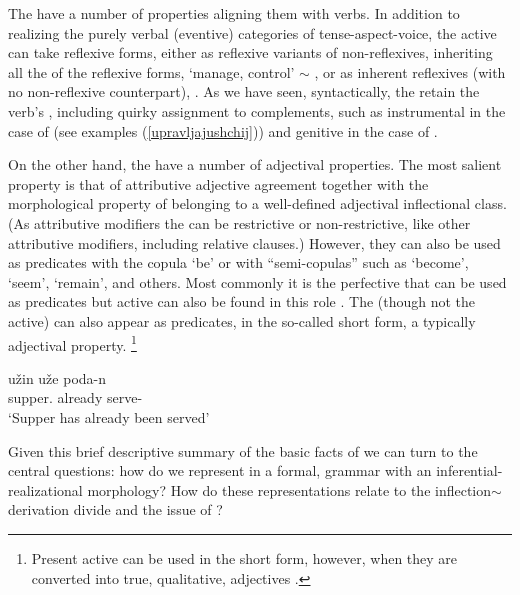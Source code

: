 \documentclass[output=paper,
modfonts
]{LSP/langsci}
\begin{document}
%
The  have a number of properties aligning them with verbs. In addition to  realizing the purely verbal (eventive) categories of tense-aspect-voice, the active  can take reflexive forms, either as reflexive variants of non-reflexives, inheriting all the  of the reflexive forms,  ‘manage, control’ $\sim$ , or as inherent reflexives (with no non-reflexive counterpart), . As we have seen, syntactically, the  retain the verb’s , including quirky  assignment to complements, such as instrumental in the case of 
 (see examples (\ref{upravljajushchij})) and genitive in the case of .
%

%
On the other hand, the  have a number of adjectival properties. The most  salient  property is that of attributive adjective agreement together with the morphological property of belonging to a well-defined adjectival inflectional class. (As attributive modifiers the  can be restrictive or non-restrictive, like other attributive modifiers, including relative clauses.) However, they can also be used as predicates with the copula  ‘be’ or with ``semi-copulas'' such as  ‘become’,  ‘seem’,   ‘remain’, and others. Most commonly it is the perfective   that can be used as predicates but active  can also be found in this role \parencite[291, \S2346]{RussGramm80-II}. The  (though not the active)  can also appear as predicates, in the so-called short form, a typically adjectival property.%
\footnote%
{Present active  can be used in the short form, however, when they are converted into true, qualitative, adjectives \parencite[666]{RussGramm80-I}.
}
%


\begin{exe} \ex	\label{podan}

\gll	užin uže poda-n\\
	supper.	already 	serve-\\
\glt	‘Supper has already been served’
\end{exe}
  
Given this brief descriptive summary of the basic facts of   we can turn to the central questions: how do we represent  in a formal,  grammar with an inferential-realizational morphology? How do these representations relate to the inflection$\sim$derivation divide and the issue of ? 
\end{document}

